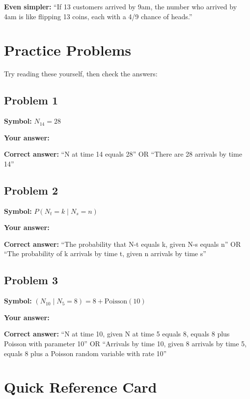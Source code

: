 \documentclass[11pt]{article}
\begin{document}
\textbf{Even simpler:} ``If 13 customers arrived by 9am, the number who arrived by 4am is like flipping 13 coins, each with a 4/9 chance of heads.''

\section{Practice Problems}

Try reading these yourself, then check the answers:

\subsection{Problem 1}

\textbf{Symbol:} $N_{14} = 28$

\textbf{Your answer:} \underline{\hspace{8cm}}

\textbf{Correct answer:} ``N at time 14 equals 28'' OR ``There are 28 arrivals by time 14''

\subsection{Problem 2}

\textbf{Symbol:} $P(N_t = k \mid N_s = n)$

\textbf{Your answer:} \underline{\hspace{8cm}}

\textbf{Correct answer:} ``The probability that N-t equals k, given N-s equals n'' OR ``The probability of k arrivals by time t, given n arrivals by time s''

\subsection{Problem 3}

\textbf{Symbol:} $(N_{10} \mid N_5 = 8) = 8 + \text{Poisson}(10)$

\textbf{Your answer:} \underline{\hspace{8cm}}

\textbf{Correct answer:} ``N at time 10, given N at time 5 equals 8, equals 8 plus Poisson with parameter 10'' OR ``Arrivals by time 10, given 8 arrivals by time 5, equals 8 plus a Poisson random variable with rate 10''

\section{Quick Reference Card}
\end{document}

